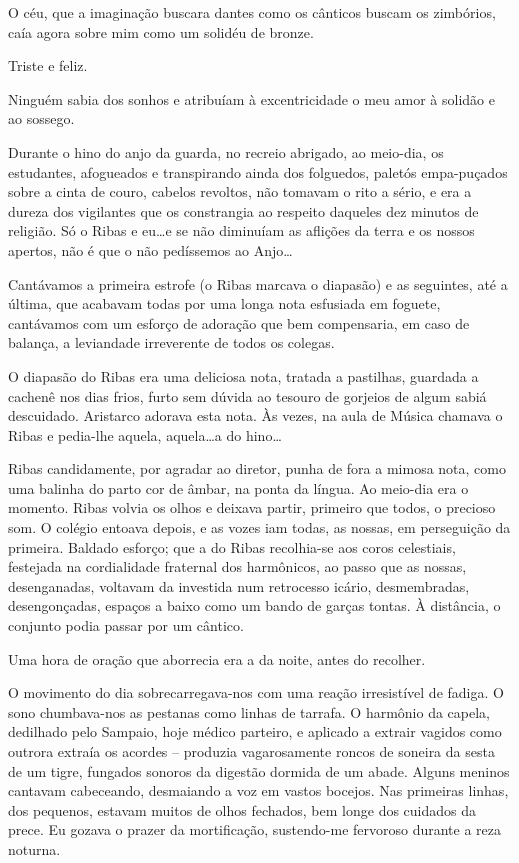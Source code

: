 O céu, que a imaginação buscara dantes como os cânticos
buscam os zimbórios, caía agora sobre mim como um solidéu de bronze.

Triste e feliz. 

Ninguém sabia dos sonhos e atribuíam à excentricidade o
meu amor à solidão e ao sossego. 

Durante o hino do anjo da guarda, no
recreio abrigado, ao meio{}-dia, os estudantes, afogueados e
transpirando ainda dos folguedos, paletós empa{}-puçados sobre a cinta
de couro, cabelos revoltos, não tomavam o rito a sério, e era a dureza
dos vigilantes que os constrangia ao respeito daqueles dez minutos de
religião. Só o Ribas e eu\ldots e se não diminuíam as aflições da terra e
os nossos apertos, não é que o não pedíssemos ao Anjo\ldots 

Cantávamos a
primeira estrofe (o Ribas marcava o diapasão) e as seguintes, até a
última, que acabavam todas por uma longa nota esfusiada em foguete,
cantávamos com um esforço de adoração que bem compensaria, em caso de
balança, a leviandade irreverente de todos os colegas. 

O diapasão do Ribas era uma deliciosa nota, tratada a pastilhas, guardada a
cachenê nos dias frios, furto sem dúvida ao tesouro de gorjeios de
algum sabiá descuidado. Aristarco adorava esta nota. Às vezes, na aula
de Música chamava o Ribas e pedia{}-lhe aquela, aquela\ldots a do hino\ldots

Ribas candidamente, por agradar ao diretor, punha de fora a mimosa
nota, como uma balinha do parto cor de âmbar, na ponta da língua. Ao
meio{}-dia era o momento. Ribas volvia os olhos e deixava partir,
primeiro que todos, o precioso som. O colégio entoava depois, e as
vozes iam todas, as nossas, em perseguição da primeira. Baldado
esforço; que a do Ribas recolhia{}-se aos coros celestiais, festejada
na cordialidade fraternal dos harmônicos, ao passo que as nossas,
desenganadas, voltavam da investida num retrocesso icário,
desmembradas, desengonçadas, espaços a baixo como um bando de garças
tontas. À distância, o conjunto podia passar por um cântico. 

Uma hora de oração que aborrecia era a da noite, antes do recolher. 

O movimento do dia sobrecarregava{}-nos com uma reação irresistível de fadiga. 
O sono chumbava{}-nos as pestanas como linhas de tarrafa. O harmônio da
capela, dedilhado pelo Sampaio, hoje médico parteiro, e aplicado a
extrair vagidos como outrora extraía os acordes -- produzia
vagarosamente roncos de soneira da sesta de um tigre, fungados sonoros
da digestão dormida de um abade. Alguns meninos cantavam cabeceando,
desmaiando a voz em vastos bocejos. Nas primeiras linhas, dos pequenos,
estavam muitos de olhos fechados, bem longe dos cuidados da prece. Eu
gozava o prazer da mortificação, sustendo{}-me fervoroso durante a reza
noturna. 


